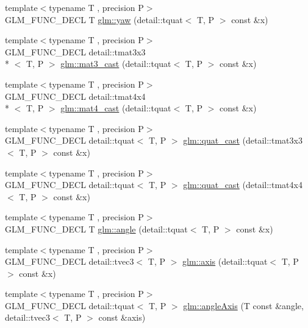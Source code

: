\begin{DoxyCompactItemize}
\item 
{\footnotesize template$<$typename T , precision P$>$ }\\G\-L\-M\-\_\-\-F\-U\-N\-C\-\_\-\-D\-E\-C\-L T \hyperlink{group__gtc__quaternion_ga1de7653ddf380ff06d2300eea831664c}{glm\-::yaw} (detail\-::tquat$<$ T, P $>$ const \&x)
\item 
{\footnotesize template$<$typename T , precision P$>$ }\\G\-L\-M\-\_\-\-F\-U\-N\-C\-\_\-\-D\-E\-C\-L detail\-::tmat3x3\\*
$<$ T, P $>$ \hyperlink{group__gtc__quaternion_ga65257c3494022ad80a50ce11da95049d}{glm\-::mat3\-\_\-cast} (detail\-::tquat$<$ T, P $>$ const \&x)
\item 
{\footnotesize template$<$typename T , precision P$>$ }\\G\-L\-M\-\_\-\-F\-U\-N\-C\-\_\-\-D\-E\-C\-L detail\-::tmat4x4\\*
$<$ T, P $>$ \hyperlink{group__gtc__quaternion_gafc4e34c836f7ccb5f3bb2a0373c831e0}{glm\-::mat4\-\_\-cast} (detail\-::tquat$<$ T, P $>$ const \&x)
\item 
{\footnotesize template$<$typename T , precision P$>$ }\\G\-L\-M\-\_\-\-F\-U\-N\-C\-\_\-\-D\-E\-C\-L detail\-::tquat$<$ T, P $>$ \hyperlink{group__gtc__quaternion_gafb826745dedb1760100bbd25d0f63fde}{glm\-::quat\-\_\-cast} (detail\-::tmat3x3$<$ T, P $>$ const \&x)
\item 
{\footnotesize template$<$typename T , precision P$>$ }\\G\-L\-M\-\_\-\-F\-U\-N\-C\-\_\-\-D\-E\-C\-L detail\-::tquat$<$ T, P $>$ \hyperlink{group__gtc__quaternion_ga385af22ef1a45c4464ddd28b80d5ce18}{glm\-::quat\-\_\-cast} (detail\-::tmat4x4$<$ T, P $>$ const \&x)
\item 
{\footnotesize template$<$typename T , precision P$>$ }\\G\-L\-M\-\_\-\-F\-U\-N\-C\-\_\-\-D\-E\-C\-L T \hyperlink{group__gtc__quaternion_ga23a3fc7ada5bbb665ff84c92c6e0542c}{glm\-::angle} (detail\-::tquat$<$ T, P $>$ const \&x)
\item 
{\footnotesize template$<$typename T , precision P$>$ }\\G\-L\-M\-\_\-\-F\-U\-N\-C\-\_\-\-D\-E\-C\-L detail\-::tvec3$<$ T, P $>$ \hyperlink{group__gtc__quaternion_ga8eef9f8c3f2e4836dccf09df975b20fb}{glm\-::axis} (detail\-::tquat$<$ T, P $>$ const \&x)
\item 
{\footnotesize template$<$typename T , precision P$>$ }\\G\-L\-M\-\_\-\-F\-U\-N\-C\-\_\-\-D\-E\-C\-L detail\-::tquat$<$ T, P $>$ \hyperlink{group__gtc__quaternion_ga771b3e16cca8324e7111b923476be666}{glm\-::angle\-Axis} (T const \&angle, detail\-::tvec3$<$ T, P $>$ const \&axis)

\end{DoxyCompactItemize}
